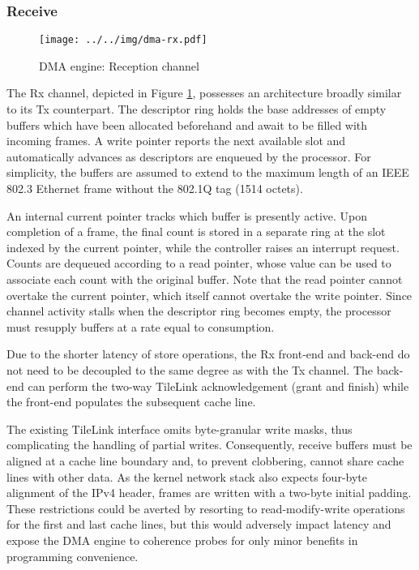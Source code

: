\subsubsection{Receive}

\begin{figure}[t]
\begin{center}
\texttt{[image: ../../img/dma-rx.pdf]}
\caption{DMA engine: Reception channel}
\label{fig:dma-rx}
\end{center}
\end{figure}

The Rx channel, depicted in Figure \ref{fig:dma-rx}, possesses an
architecture broadly similar to its Tx counterpart.
The descriptor ring holds the base addresses of empty buffers which have
been allocated beforehand and await to be filled with incoming frames.
A write pointer reports the next available slot and automatically
advances as descriptors are enqueued by the processor.
For simplicity, the buffers are assumed to extend to the maximum length
of an IEEE 802.3 Ethernet frame without the 802.1Q tag (1514 octets).

An internal current pointer tracks which buffer is presently active.
Upon completion of a frame, the final count is stored in a separate ring
at the slot indexed by the current pointer, while the controller raises
an interrupt request.
Counts are dequeued according to a read pointer, whose value can be used
to associate each count with the original buffer.
Note that the read pointer cannot overtake the current pointer, which
itself cannot overtake the write pointer.
Since channel activity stalls when the descriptor ring becomes empty,
the processor must resupply buffers at a rate equal to consumption.

Due to the shorter latency of store operations, the Rx front-end and
back-end do not need to be decoupled to the same degree as with the Tx
channel.
The back-end can perform the two-way TileLink acknowledgement (grant and
finish) while the front-end populates the subsequent cache line.

The existing TileLink interface omits byte-granular write masks, thus
complicating the handling of partial writes.
Consequently, receive buffers must be aligned at a cache line boundary
and, to prevent clobbering, cannot share cache lines with other data.
As the kernel network stack also expects four-byte alignment of the IPv4
header, frames are written with a two-byte initial padding.
These restrictions could be averted by resorting to read-modify-write
operations for the first and last cache lines, but this would adversely
impact latency and expose the DMA engine to coherence probes for only
minor benefits in programming convenience.

